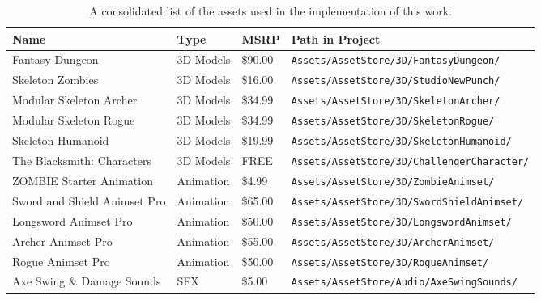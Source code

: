 \begin{table}[!h]
  \begin{center}
    \caption{A consolidated list of the assets used in the implementation of this work.}
    \label{tab:table-game-assets}
    \begin{tabular}{ >{\small}w{l}{11em} >{\small}w{c}{4em} >{\small}w{c}{3em} m{13em} } %
      \addlinespace
      \toprule
      \textbf{Name}                & \bf Type  & \bf MSRP & \textbf{\small Path in Project}                             \\
      \midrule
      Fantasy Dungeon              & 3D Models &  \$90.00 & \texttt{\tiny Assets/AssetStore/3D/FantasyDungeon/}      \\ 
      Skeleton Zombies             & 3D Models &  \$16.00 & \texttt{\tiny Assets/AssetStore/3D/StudioNewPunch/}      \\
      Modular Skeleton Archer      & 3D Models &  \$34.99 & \texttt{\tiny Assets/AssetStore/3D/SkeletonArcher/}      \\
      Modular Skeleton Rogue       & 3D Models &  \$34.99 & \texttt{\tiny Assets/AssetStore/3D/SkeletonRogue/}       \\
      Skeleton Humanoid            & 3D Models &  \$19.99 & \texttt{\tiny Assets/AssetStore/3D/SkeletonHumanoid/}    \\
      The Blacksmith: Characters   & 3D Models &     FREE & \texttt{\tiny Assets/AssetStore/3D/ChallengerCharacter/} \\
      \midrule
      ZOMBIE Starter Animation     & Animation &   \$4.99 & \texttt{\tiny Assets/AssetStore/3D/ZombieAnimset/}       \\
      Sword and Shield Animset Pro & Animation &  \$65.00 & \texttt{\tiny Assets/AssetStore/3D/SwordShieldAnimset/}  \\
      Longsword Animset Pro        & Animation &  \$50.00 & \texttt{\tiny Assets/AssetStore/3D/LongswordAnimset/}    \\
      Archer Animset Pro           & Animation &  \$55.00 & \texttt{\tiny Assets/AssetStore/3D/ArcherAnimset/}       \\
      Rogue Animset Pro            & Animation &  \$50.00 & \texttt{\tiny Assets/AssetStore/3D/RogueAnimset/}        \\
      \midrule
      Axe Swing \& Damage Sounds   & SFX       &   \$5.00 & \texttt{\tiny Assets/AssetStore/Audio/AxeSwingSounds/}   \\

\end{tabular}
\end{center}
\end{table}
